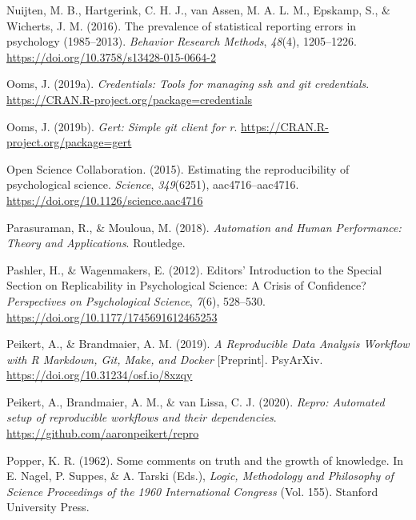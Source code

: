 \documentclass[12pt,a4paper,twoside]{article}
\begin{document}
\leavevmode\hypertarget{ref-nuijtenPrevalenceStatisticalReporting2016}{}%
Nuijten, M. B., Hartgerink, C. H. J., van Assen, M. A. L. M., Epskamp, S., \& Wicherts, J. M. (2016). The prevalence of statistical reporting errors in psychology (1985--2013). \emph{Behavior Research Methods}, \emph{48}(4), 1205--1226. \url{https://doi.org/10.3758/s13428-015-0664-2}

\leavevmode\hypertarget{ref-R-credentials}{}%
Ooms, J. (2019a). \emph{Credentials: Tools for managing ssh and git credentials}. \url{https://CRAN.R-project.org/package=credentials}

\leavevmode\hypertarget{ref-R-gert}{}%
Ooms, J. (2019b). \emph{Gert: Simple git client for r}. \url{https://CRAN.R-project.org/package=gert}

\leavevmode\hypertarget{ref-opensciencecollaborationEstimatingReproducibilityPsychological2015}{}%
Open Science Collaboration. (2015). Estimating the reproducibility of psychological science. \emph{Science}, \emph{349}(6251), aac4716--aac4716. \url{https://doi.org/10.1126/science.aac4716}

\leavevmode\hypertarget{ref-parasuramanAutomationHumanPerformance2018}{}%
Parasuraman, R., \& Mouloua, M. (2018). \emph{Automation and Human Performance: Theory and Applications}. Routledge.

\leavevmode\hypertarget{ref-pashlerEditorsIntroductionSpecial2012}{}%
Pashler, H., \& Wagenmakers, E. (2012). Editors' Introduction to the Special Section on Replicability in Psychological Science: A Crisis of Confidence? \emph{Perspectives on Psychological Science}, \emph{7}(6), 528--530. \url{https://doi.org/10.1177/1745691612465253}

\leavevmode\hypertarget{ref-peikertReproducibleDataAnalysis2019}{}%
Peikert, A., \& Brandmaier, A. M. (2019). \emph{A Reproducible Data Analysis Workflow with R Markdown, Git, Make, and Docker} {[}Preprint{]}. PsyArXiv. \url{https://doi.org/10.31234/osf.io/8xzqy}

\leavevmode\hypertarget{ref-R-repro}{}%
Peikert, A., Brandmaier, A. M., \& van Lissa, C. J. (2020). \emph{Repro: Automated setup of reproducible workflows and their dependencies}. \url{https://github.com/aaronpeikert/repro}

\leavevmode\hypertarget{ref-popperCommentsTruthGrowth1962}{}%
Popper, K. R. (1962). Some comments on truth and the growth of knowledge. In E. Nagel, P. Suppes, \& A. Tarski (Eds.), \emph{Logic, Methodology and Philosophy of Science Proceedings of the 1960 International Congress} (Vol. 155). Stanford University Press.
\end{document}

